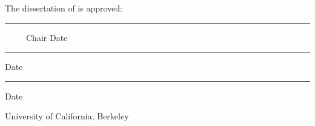 \MyDoubleSpacing

\begin{minipage}{0.85\linewidth}
  \begin{center}
    The dissertation of \MyAuthor is approved:

    \vspace{3.5\baselineskip}
    \hrule\vspace{0.25\baselineskip}
    {\small\ \ \ \ \ Chair \hfill Date}
    \vspace{3\baselineskip}
    \hrule\vspace{0.25\baselineskip}
    {\small\hfill Date}
    \vspace{3\baselineskip}
    \hrule\vspace{0.25\baselineskip}
    {\small\hfill Date}
    \vspace{2.5\baselineskip}   %

    University of California, Berkeley\\
    \vspace{1.5\baselineskip}
    \MyDate
  \end{center}
\end{minipage}

\clearpage
